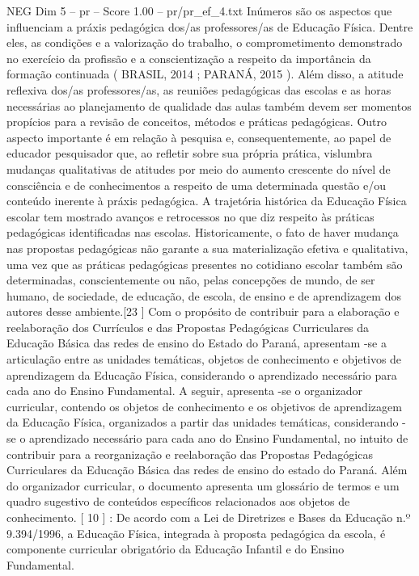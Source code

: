\begin{textsample}{NEG Dim 5 – pr – Score 1.00 – pr/pr\_ef\_4.txt}
Inúmeros são os aspectos que influenciam a práxis pedagógica dos/as professores/as de Educação Física.
Dentre eles, as condições e a valorização do trabalho, o comprometimento demonstrado no exercício da profissão e a conscientização a respeito da importância da formação continuada ( BRASIL, 2014 ; PARANÁ, 2015 ).
Além disso, a atitude reflexiva dos/as professores/as, as reuniões pedagógicas das escolas e as horas necessárias ao planejamento de qualidade das aulas também devem ser momentos propícios para a revisão de conceitos, métodos e práticas pedagógicas.
Outro aspecto importante é em relação à pesquisa e, consequentemente, ao papel de educador pesquisador que, ao refletir sobre sua própria prática, vislumbra mudanças qualitativas de atitudes por meio do aumento crescente do nível de consciência e de conhecimentos a respeito de uma determinada questão e/ou conteúdo inerente à práxis pedagógica.
A trajetória histórica da Educação Física escolar tem mostrado avanços e retrocessos no que diz respeito às práticas pedagógicas identificadas nas escolas.
Historicamente, o fato de haver mudança nas propostas pedagógicas não garante a sua materialização efetiva e qualitativa, uma vez que as práticas pedagógicas presentes no cotidiano escolar também são determinadas, conscientemente ou não, pelas concepções de mundo, de ser humano, de sociedade, de educação, de escola, de ensino e de aprendizagem dos autores desse ambiente.[23 ] Com o propósito de contribuir para a elaboração e reelaboração dos Currículos e das Propostas Pedagógicas Curriculares da Educação Básica das redes de ensino do Estado do Paraná, apresentam -se a articulação entre as unidades temáticas, objetos de conhecimento e objetivos de aprendizagem da Educação Física, considerando o aprendizado necessário para cada ano do Ensino Fundamental.
A seguir, apresenta -se o organizador curricular, contendo os objetos de conhecimento e os objetivos de aprendizagem da Educação Física, organizados a partir das unidades temáticas, considerando -se o aprendizado necessário para cada ano do Ensino Fundamental, no intuito de contribuir para a reorganização e reelaboração das Propostas Pedagógicas Curriculares da Educação Básica das redes de ensino do estado do Paraná.
Além do organizador curricular, o documento apresenta um glossário de termos e um quadro sugestivo de conteúdos específicos relacionados aos objetos de conhecimento. [ 10 ] : De acordo com a Lei de Diretrizes e Bases da Educação n.º 9.394/1996, a Educação Física, integrada à proposta pedagógica da escola, é componente curricular obrigatório da Educação Infantil e do Ensino Fundamental.

\end{textsample}
